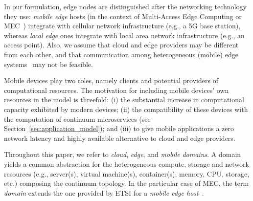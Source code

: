 %
%

In our formulation, edge nodes are distinguished after the networking technology they use: \textit{mobile edge} hosts (in the context of Multi-Access Edge Computing or MEC~\cite{etsimec16,ahmed2016isco}) integrate with cellular network infrastructure (e.g., a 5G base station), whereas \textit{local edge} ones integrate with local area network infrastructure (e.g., an access point). Also, we assume that cloud and edge providers may be different from each other, and that communication among heterogeneous (mobile) edge systems~\cite{etsimec16} may not be feasible.%


Mobile devices play two roles, namely clients and potential providers of computational resources. The motivation for including mobile devices' own resources in the model is threefold: (i) the substantial increase in computational capacity exhibited by modern devices; (ii) the compatibility of these devices with the computation of continuum microservices (see Section~\ref{sec:application_model}); and (iii) to give mobile applications a zero network latency and highly available alternative to cloud and edge providers. 

Throughout this paper, we refer to \textit{cloud}, \textit{edge}, and \textit{mobile} \textit{domains}. 
A domain yields a common  abstraction for the heterogeneous compute, storage and network resources (e.g., server(s), virtual machine(s), container(s), memory, CPU, storage, etc.) composing the continuum topology. In the particular case of MEC, the term \textit{domain} extends the one provided by ETSI for a \textit{mobile edge host}~\cite{etsimec16}.



